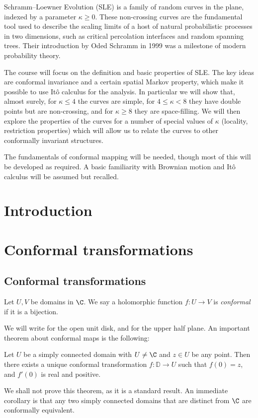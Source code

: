 \documentclass[a4paper]{article}
\renewcommand\D{\mathbb{D}}
\begin{document}
\maketitle
{\small
\setlength{\parindent}{0em}
\setlength{\parskip}{1em}
Schramm--Loewner Evolution (SLE) is a family of random curves in the plane, indexed by a parameter $\kappa \geq 0$. These non-crossing curves are the fundamental tool used to describe the scaling limits of a host of natural probabilistic processes in two dimensions, such as critical percolation interfaces and random spanning trees. Their introduction by Oded Schramm in 1999 was a milestone of modern probability theory.

The course will focus on the definition and basic properties of SLE. The key ideas are conformal invariance and a certain spatial Markov property, which make it possible to use It\^o calculus for the analysis. In particular we will show that, almost surely, for $\kappa \leq 4$ the curves are simple, for $4 \leq \kappa < 8$ they have double points but are non-crossing, and for $\kappa \geq 8$ they are space-filling. We will then explore the properties of the curves for a number of special values of $\kappa$ (locality, restriction properties) which will allow us to relate the curves to other conformally invariant structures.

The fundamentals of conformal mapping will be needed, though most of this will be developed as required. A basic familiarity with Brownian motion and It\^o calculus will be assumed but recalled.
}
\tableofcontents

\setcounter{section}{-1}
\section{Introduction}
\section{Conformal transformations}
\subsection{Conformal transformations}
\begin{defi}
  Let $U, V$ be domains in $\C$. We say a holomorphic function $f: U \to V$ is \emph{conformal} if it is a bijection.
\end{defi}

We will write \term{$\D$} for the open unit disk, and \term{$\H$} for the upper half plane. An important theorem about conformal maps is the following:
\begin{thm}
  Let $U$ be a simply connected domain with $U \not= \C$ and $z \in U$ be any point. Then there exists a unique conformal transformation $f: \D \to U$ such that $f(0) = z$, and $f'(0)$ is real and positive.
\end{thm}
We shall not prove this theorem, as it is a standard result. An immediate corollary is that any two simply connected domains that are distinct from $\C$ are conformally equivalent.
\end{document}
